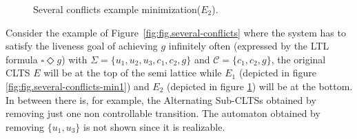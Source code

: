 \begin{figure}[bt]
\centering
\SmallPicture
{}
\caption{Several conflicts example minimization($E_2$).}
\label{fig:fig.several-conflicts-min2}
\MediumPicture
\end{figure}

Consider the example of Figure~\ref{fig:fig.several-conflicts} where the system has to satisfy the liveness goal of
achieving $g$ infinitely often (expressed
by the LTL formula $\square \Diamond g$)
with $\Sigma = \{u_1, u_2, u_3, c_1, c_2, g\}$ and 
$\mathcal{C} = \{c_1, c_2, g\}$, the original CLTS $E$ will be
at the top of the semi lattice while $E_1$ (depicted in figure \ref{fig:fig.several-conflicts-min1}) and $E_2$ (depicted in 
figure \ref{fig:fig.several-conflicts-min2}) will be at 
the bottom.  In between there is, for example, the Alternating Sub-CLTSs
obtained by removing just one non controllable transition.  
The automaton obtained by removing $\{u_1, u_3\}$ is not shown
since it is realizable. 
%
%
%

 
